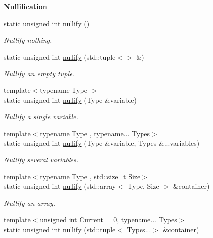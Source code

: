\begin{Indent}{\bf Nullification}\par
\begin{DoxyCompactItemize}
\item 
static unsigned int \hyperlink{exceptionmagrathea_1_1DataHandler_a7958f101a7437fe5ada971be5eceef32}{nullify} ()
\begin{DoxyCompactList}\small\item\em Nullify nothing. \end{DoxyCompactList}\item 
static unsigned int \hyperlink{exceptionmagrathea_1_1DataHandler_ad0026082d808e1bba847e0abdb142d61}{nullify} (std\-::tuple$<$$>$ \&)
\begin{DoxyCompactList}\small\item\em Nullify an empty tuple. \end{DoxyCompactList}\item 
{\footnotesize template$<$typename Type $>$ }\\static unsigned int \hyperlink{exceptionmagrathea_1_1DataHandler_aaa0ca7b9d5b2659fd567df2ceab1f0e7}{nullify} (Type \&variable)
\begin{DoxyCompactList}\small\item\em Nullify a single variable. \end{DoxyCompactList}\item 
{\footnotesize template$<$typename Type , typename... Types$>$ }\\static unsigned int \hyperlink{exceptionmagrathea_1_1DataHandler_ab7f14c311ad2d5f0f6faaef4383db779}{nullify} (Type \&variable, Types \&...variables)
\begin{DoxyCompactList}\small\item\em Nullify several variables. \end{DoxyCompactList}\item 
{\footnotesize template$<$typename Type , std\-::size\-\_\-t Size$>$ }\\static unsigned int \hyperlink{exceptionmagrathea_1_1DataHandler_a88ed5c28c8d5eb5b66338af0e1018852}{nullify} (std\-::array$<$ Type, Size $>$ \&container)
\begin{DoxyCompactList}\small\item\em Nullify an array. \end{DoxyCompactList}\item 
{\footnotesize template$<$unsigned int Current = 0, typename... Types$>$ }\\static unsigned int \hyperlink{exceptionmagrathea_1_1DataHandler_a87e291616af2fba57c18aa231eefd333}{nullify} (std\-::tuple$<$ Types...$>$ \&container)
$$
\end{DoxyCompactItemize}
\end{Indent}
